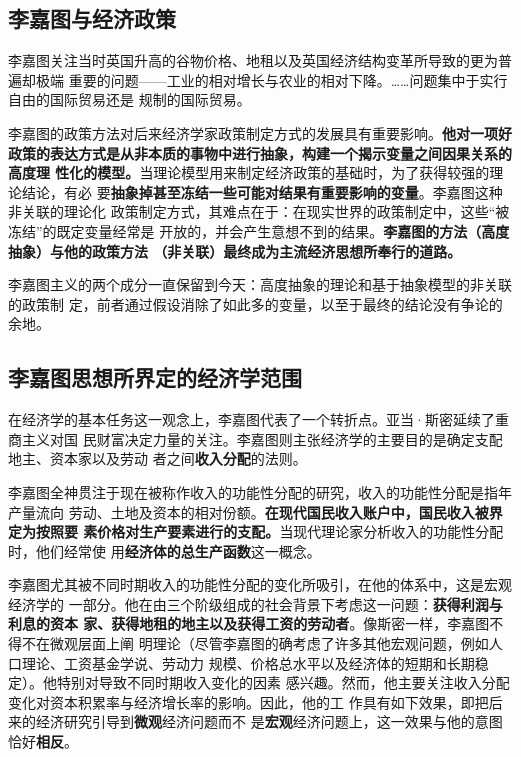 \subsection{李嘉图与经济政策}

李嘉图关注当时英国升高的谷物价格、地租以及英国经济结构变革所导致的更为普遍却极端
重要的问题——工业的相对增长与农业的相对下降。……问题集中于实行自由的国际贸易还是
规制的国际贸易。

李嘉图的政策方法对后来经济学家政策制定方式的发展具有重要影响。\textbf{他对一项好
  政策的表达方式是从非本质的事物中进行抽象，构建一个揭示变量之间因果关系的高度理
  性化的模型。}当理论模型用来制定经济政策的基础时，为了获得较强的理论结论，有必
要\textbf{抽象掉甚至冻结一些可能对结果有重要影响的变量}。李嘉图这种非关联的理论化
政策制定方式，其难点在于：在现实世界的政策制定中，这些“被冻结”的既定变量经常是
开放的，并会产生意想不到的结果。\textbf{李嘉图的方法（高度抽象）与他的政策方法
  （非关联）最终成为主流经济思想所奉行的道路。}

李嘉图主义的两个成分一直保留到今天：高度抽象的理论和基于抽象模型的非关联的政策制
定，前者通过假设消除了如此多的变量，以至于最终的结论没有争论的余地。

\subsection{李嘉图思想所界定的经济学范围}

在经济学的基本任务这一观念上，李嘉图代表了一个转折点。亚当·斯密延续了重商主义对国
民财富决定力量的关注。李嘉图则主张经济学的主要目的是确定支配地主、资本家以及劳动
者之间\textbf{收入分配}的法则。

李嘉图全神贯注于现在被称作收入的功能性分配的研究，收入的功能性分配是指年产量流向
劳动、土地及资本的相对份额。\textbf{在现代国民收入账户中，国民收入被界定为按照要
  素价格对生产要素进行的支配。}当现代理论家分析收入的功能性分配时，他们经常使
用\textbf{经济体的总生产函数}这一概念。

李嘉图尤其被不同时期收入的功能性分配的变化所吸引，在他的体系中，这是宏观经济学的
一部分。他在由三个阶级组成的社会背景下考虑这一问题：\textbf{获得利润与利息的资本
  家、获得地租的地主以及获得工资的劳动者}。像斯密一样，李嘉图不得不在微观层面上阐
明理论（尽管李嘉图的确考虑了许多其他宏观问题，例如人口理论、工资基金学说、劳动力
规模、价格总水平以及经济体的短期和长期稳定）。他特别对导致不同时期收入变化的因素
感兴趣。然而，他主要关注收入分配变化对资本积累率与经济增长率的影响。因此，他的工
作具有如下效果，即把后来的经济研究引导到\textbf{微观}经济问题而不
是\textbf{宏观}经济问题上，这一效果与他的意图恰好\textbf{相反}。

